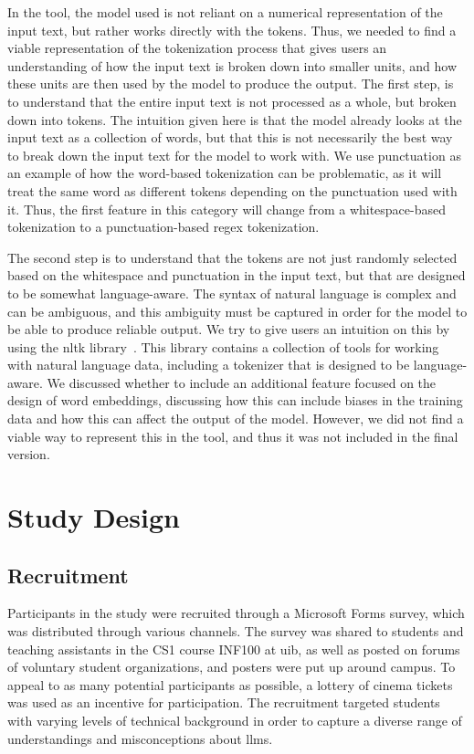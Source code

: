 In the tool, the model used is not reliant on a numerical representation of the input text, but rather works directly with the tokens. Thus, we needed to find a viable representation of the tokenization process that gives users an understanding of how the input text is broken down into smaller units, and how these units are then used by the model to produce the output. The first step, is to understand that the entire input text is not processed as a whole, but broken down into tokens. The intuition given here is that the model already looks at the input text as a collection of words, but that this is not necessarily the best way to break down the input text for the model to work with. We use punctuation as an example of how the word-based tokenization can be problematic, as it will treat the same word as different tokens depending on the punctuation used with it. Thus, the first feature in this category will change from a whitespace-based tokenization to a punctuation-based \gls{regex} tokenization.

The second step is to understand that the tokens are not just randomly selected based on the whitespace and punctuation in the input text, but that are designed to be somewhat language-aware. The syntax of natural language is complex and can be ambiguous, and this ambiguity must be captured in order for the model to be able to produce reliable output. We try to give users an intuition on this by using the \gls{nltk} library~\cite{nltk}. This library contains a collection of tools for working with natural language data, including a tokenizer that is designed to be language-aware.
We discussed whether to include an additional feature focused on the design of word embeddings, discussing how this can include biases in the training data and how this can affect the output of the model. However, we did not find a viable way to represent this in the tool, and thus it was not included in the final version.

\section{Study Design}
\subsection{Recruitment}
Participants in the study were recruited through a Microsoft Forms survey, which was distributed through various channels. The survey was shared to students and teaching assistants in the CS1 course INF100 at \gls{uib}, as well as posted on forums of voluntary student organizations, and posters were put up around campus. To appeal to as many potential participants as possible, a lottery of cinema tickets was used as an incentive for participation. The recruitment targeted students with varying levels of
technical background in order to capture a diverse range
of understandings and misconceptions about \gls{llms}.

